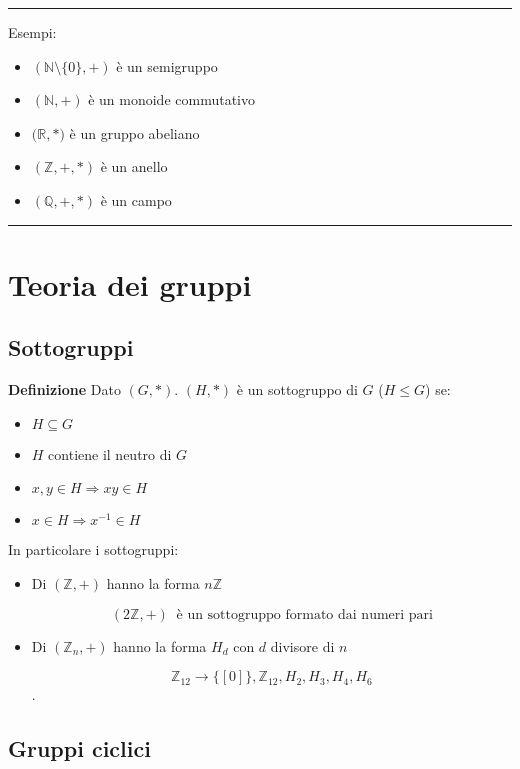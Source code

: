 \documentclass{article}
\begin{document}
\noindent\rule{\textwidth}{0.5pt}
Esempi:
\begin{itemize}
    \item $(\mathbb{N}\setminus\{0\},+)$ è un semigruppo
    \item $(\mathbb{N},+)$ è un monoide commutativo
    \item $(\mathbb{R,*)}$ è un gruppo abeliano
    \item $(\mathbb{Z},+,*)$ è un anello
    \item $(\mathbb{Q,+,*})$ è un campo
\end{itemize}
\noindent\rule{\textwidth}{0.5pt}

\section{Teoria dei gruppi}

\subsection{Sottogruppi}

\noindent\textbf{Definizione} Dato $(G,*)$. $(H,*)$ è un sottogruppo di $G$ ($H\leqslant G$) se:
\begin{itemize}
    \item $H\subseteq G$
    \item $H$ contiene il neutro di $G$
    \item $x,y\in H\Rightarrow xy\in H$
    \item $x\in H\Rightarrow x^{-1}\in H$\newline
\end{itemize}

\noindent In particolare i sottogruppi:
\begin{itemize}
    \item Di $(\mathbb{Z},+)$ hanno la forma $n\mathbb{Z}$

        $$(2\mathbb{Z},+)\ \text{ è un sottogruppo formato dai numeri pari}$$

    \vspace{5pt}
    
    \item Di $(\mathbb{Z}_n,+)$ hanno la forma $H_d$ con $d$ divisore di $n$

        $$\mathbb{Z}_{12}\rightarrow\{[0]\},\mathbb{Z}_{12},H_2,H_3,H_4,H_6$$.
    
\end{itemize}

\subsection{Gruppi ciclici}
\end{document}
